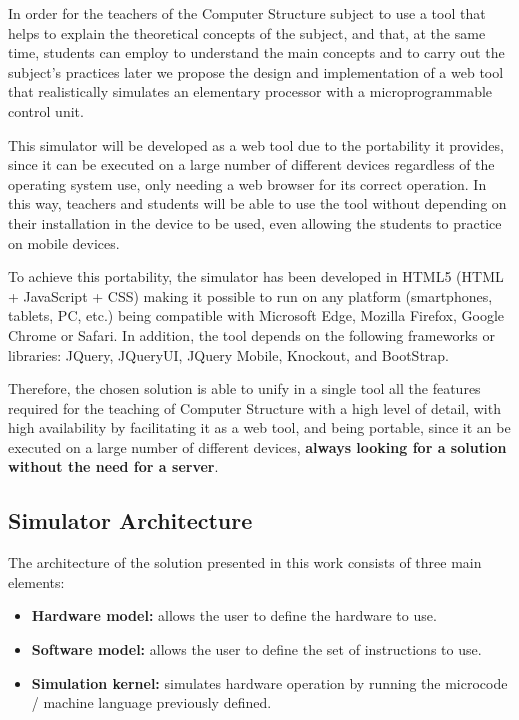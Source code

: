 In order for the teachers of the Computer Structure subject to use a tool that helps to explain the theoretical concepts of the subject, and that, at the same time, students can employ to understand the main concepts and to carry out the subject's practices later we propose the design and implementation of a web tool that realistically simulates an elementary processor with a microprogrammable control unit.

This simulator will be developed as a web tool due to the portability it provides, since it can be executed on a large number of different devices regardless of the operating system use, only needing a web browser for its correct operation. In this way, teachers and students will be able to use the tool without depending on their installation in the device to be used, even allowing the students to practice on mobile devices.

To achieve this portability, the simulator has been developed in HTML5 (HTML + JavaScript + CSS) making it possible to run on any platform (smartphones, tablets, PC, etc.) being compatible with Microsoft Edge, Mozilla Firefox, Google Chrome or Safari. In addition, the tool depends on the following frameworks or libraries: JQuery, JQueryUI, JQuery Mobile, Knockout, and BootStrap.

Therefore, the chosen solution is able to unify in a single tool all the features required for the teaching of Computer Structure with a high level of detail, with high availability by facilitating it as a web tool, and being portable, since it an be executed on a large number of different devices, \textbf{always looking for a solution without the need for a server}.

\subsection*{Simulator Architecture}

The architecture of the solution presented in this work consists of three main elements:

\begin{itemize}
\item \textbf{Hardware model:} allows the user to define the hardware to use.
\item \textbf{Software model:} allows the user to define the set of instructions to use.
\item \textbf{Simulation kernel:} simulates hardware operation by running the microcode / machine language previously defined.
\end{itemize}

